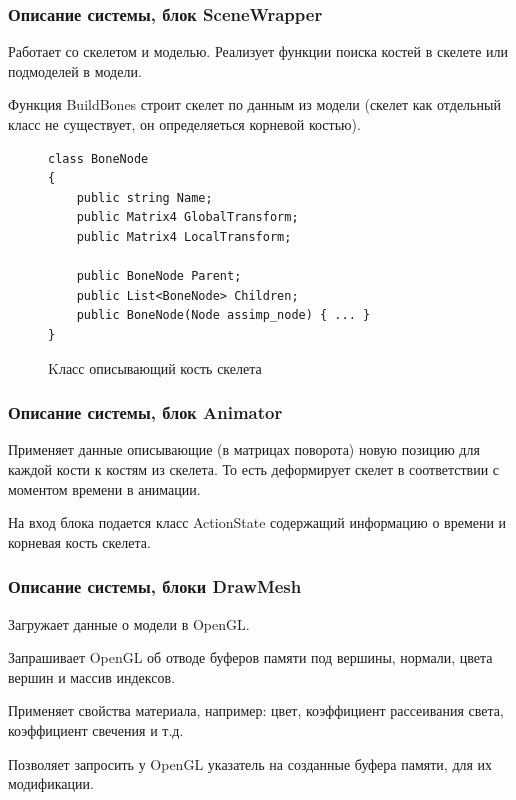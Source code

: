 \documentclass{beamer}
\begin{document}
\begin{frame}[fragile]
\frametitle{Описание системы, блок SceneWrapper}
\begin{multicols}{2}
    Работает со скелетом и моделью. Реализует функции поиска костей в скелете или подмоделей в модели.
    
    \smallskip
    Функция BuildBones строит скелет по данным из модели (скелет как отдельный класс не существует, он определяеться корневой костью). 
    
    \columnbreak
    
\begin{figure}
\begin{scriptsize}
\begin{verbatim}
class BoneNode
{
    public string Name;
    public Matrix4 GlobalTransform;
    public Matrix4 LocalTransform;
    
    public BoneNode Parent;
    public List<BoneNode> Children;
    public BoneNode(Node assimp_node) { ... }
}
\end{verbatim}
\end{scriptsize}
\caption{Kласс описывающий кость скелета}
\end{figure}

\end{multicols}
\end{frame}


\begin{frame}
\frametitle{Описание системы, блок Animator}
    Применяет данные описывающие (в матрицах поворота) новую позицию для каждой кости к костям из скелета. То есть деформирует скелет в соответствии с моментом времени в анимации.
    
    \medskip
    На вход блока подается класс ActionState содержащий информацию о времени и корневая кость скелета.
\end{frame}


\begin{frame}
\frametitle{Описание системы, блоки DrawMesh}
	Загружает данные о модели в OpenGL.
	
    \smallskip
	Запрашивает OpenGL об отводе буферов памяти под вершины, нормали, цвета вершин и массив индексов.
    
    \smallskip
    Применяет свойства материала, например: цвет, коэффициент рассеивания света, коэффициент свечения и т.д.
    
    \smallskip
    Позволяет запросить у OpenGL указатель на созданные буфера памяти, для их модификации.
\end{frame}
\end{document}

